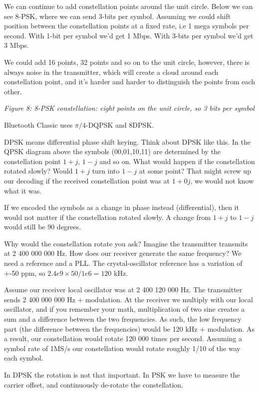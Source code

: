We can continue to add constellation points around the unit circle.
Below we can see 8-PSK, where we can send 3-bits per symbol. Assuming we
could shift position between the constellation points at a fixed rate,
i.e 1 mega symbols per second. With 1-bit per symbol we'd get 1 Mbps.
With 3-bits per symbol we'd get 3 Mbps.

We could add 16 points, 32 points and so on to the unit circle, however,
there is always noise in the transmitter, which will create a cloud
around each constellation point, and it's harder and harder to
distinguish the points from each other.


{
\centering
{}
}

\emph{Figure 8: 8-PSK constellation: eight points on the unit circle, so
3 bits per symbol}

Bluetooth Classic uses \(\pi/4\)-DQPSK and 8DPSK.

DPSK means differential phase shift keying. Think about DPSK like this.
In the QPSK diagram above the symbols (00,01,10,11) are determined by
the constellation point \(1 + j\), \(1-j\) and so on. What would happen
if the constellation rotated slowly? Would \(1+j\) turn into \(1-j\) at
some point? That might screw up our decoding if the received
constellation point was at \(1 + 0j\), we would not know what it was.

If we encoded the symbols as a change in phase instead (differential),
then it would not matter if the constellation rotated slowly. A change
from \(1+j\) to \(1-j\) would still be 90 degrees.

Why would the constellation rotate you ask? Imagine the transmitter
transmits at 2 400 000 000 Hz. How does our receiver generate the same
frequency? We need a reference and a PLL. The crystal-oscillator
reference has a variation of +-50 ppm, so \(2.4e9 \times 50/1e6 = 120\)
kHz.

Assume our receiver local oscillator was at 2 400 120 000 Hz. The
transmitter sends 2 400 000 000 Hz + modulation. At the receiver we
multiply with our local oscillator, and if you remember your math,
multiplication of two sine creates a sum and a difference between the
two frequencies. As such, the low frequency part (the difference between
the frequencies) would be 120 kHz + modulation. As a result, our
constellation would rotate 120 000 times per second. Assuming a symbol
rate of 1MS/s our constellation would rotate roughly 1/10 of the way
each symbol.

In DPSK the rotation is not that important. In PSK we have to measure
the carrier offset, and continuously de-rotate the constellation.


